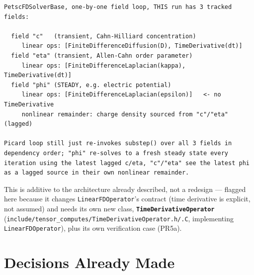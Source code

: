 \documentclass[11pt]{article}
\newenvironment{schematic}{%
  \begin{tcolorbox}[breakable, colback=codebg, colframe=gray!40, boxrule=0.4pt, arc=1mm, left=4mm, right=4mm, top=2mm, bottom=2mm]
  \ttfamily\footnotesize
}{%
  \end{tcolorbox}
}
\begin{document}
\begin{schematic}
\begin{verbatim}
PetscFDSolverBase, one-by-one field loop, THIS run has 3 tracked fields:

  field "c"   (transient, Cahn-Hilliard concentration)
     linear ops: [FiniteDifferenceDiffusion(D), TimeDerivative(dt)]
  field "eta" (transient, Allen-Cahn order parameter)
     linear ops: [FiniteDifferenceLaplacian(kappa), TimeDerivative(dt)]
  field "phi" (STEADY, e.g. electric potential)
     linear ops: [FiniteDifferenceLaplacian(epsilon)]   <- no TimeDerivative
     nonlinear remainder: charge density sourced from "c"/"eta" (lagged)

Picard loop still just re-invokes substep() over all 3 fields in
dependency order; "phi" re-solves to a fresh steady state every
iteration using the latest lagged c/eta, "c"/"eta" see the latest phi
as a lagged source in their own nonlinear remainder.
\end{verbatim}
\end{schematic}

This is additive to the architecture already described, not a redesign ---
flagged here because it changes \texttt{LinearFDOperator}'s contract (time
derivative is explicit, not assumed) and needs its own new class,
\textbf{\texttt{TimeDerivativeOperator}}
(\texttt{include/tensor\_computes/TimeDerivativeOperator.h/.C}, implementing
\texttt{LinearFDOperator}), plus its own verification case (PR5a).

\section{Decisions Already Made}
\label{sec:decisions}
\end{document}
